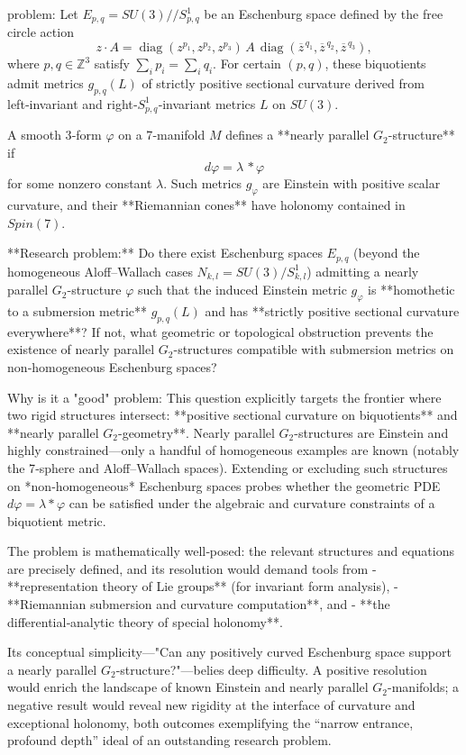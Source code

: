 problem:  
Let \(E_{p,q}=SU(3)//S^1_{p,q}\) be an Eschenburg space defined by the free circle action  
\[
z\cdot A=\operatorname{diag}(z^{p_1},z^{p_2},z^{p_3})\,A\,\operatorname{diag}(\overline{z}^{\,q_1},\overline{z}^{\,q_2},\overline{z}^{\,q_3}),
\]
where \(p,q\in\mathbb{Z}^3\) satisfy \(\sum_i p_i=\sum_i q_i.\)  
For certain \((p,q)\), these biquotients admit metrics \(g_{p,q}(L)\) of strictly positive sectional curvature derived from left‑invariant and right‑\(S^1_{p,q}\)‑invariant metrics \(L\) on \(SU(3)\).  

A smooth 3‑form \(\varphi\) on a 7‑manifold \(M\) defines a **nearly parallel \(G_2\)-structure** if  
\[
d\varphi = \lambda\, {*}\varphi
\]
for some nonzero constant \(\lambda\).  Such metrics \(g_\varphi\) are Einstein with positive scalar curvature, and their **Riemannian cones** have holonomy contained in \(Spin(7)\).  

**Research problem:**  
Do there exist Eschenburg spaces \(E_{p,q}\) (beyond the homogeneous Aloff–Wallach cases \(N_{k,l}=SU(3)/S^1_{k,l}\)) admitting a nearly parallel \(G_2\)-structure \(\varphi\) such that the induced Einstein metric \(g_\varphi\) is **homothetic to a submersion metric** \(g_{p,q}(L)\) and has **strictly positive sectional curvature everywhere**?  
If not, what geometric or topological obstruction prevents the existence of nearly parallel \(G_2\)-structures compatible with submersion metrics on non‑homogeneous Eschenburg spaces?  

Why is it a "good" problem:  
This question explicitly targets the frontier where two rigid structures intersect: **positive sectional curvature on biquotients** and **nearly parallel \(G_2\)-geometry**. Nearly parallel \(G_2\)-structures are Einstein and highly constrained—only a handful of homogeneous examples are known (notably the 7‑sphere and Aloff–Wallach spaces). Extending or excluding such structures on *non‑homogeneous* Eschenburg spaces probes whether the geometric PDE \(d\varphi=\lambda*\varphi\) can be satisfied under the algebraic and curvature constraints of a biquotient metric.  

The problem is mathematically well‑posed: the relevant structures and equations are precisely defined, and its resolution would demand tools from  
- **representation theory of Lie groups** (for invariant form analysis),  
- **Riemannian submersion and curvature computation**, and  
- **the differential‑analytic theory of special holonomy**.  

Its conceptual simplicity—"Can any positively curved Eschenburg space support a nearly parallel \(G_2\)-structure?"—belies deep difficulty. A positive resolution would enrich the landscape of known Einstein and nearly parallel \(G_2\)-manifolds; a negative result would reveal new rigidity at the interface of curvature and exceptional holonomy, both outcomes exemplifying the “narrow entrance, profound depth” ideal of an outstanding research problem.